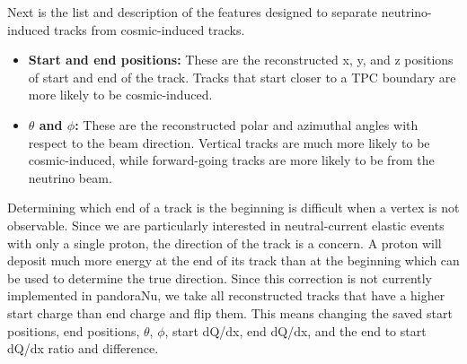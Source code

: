     Next is the list and description of the features designed to separate
    neutrino-induced tracks from cosmic-induced tracks.
    \begin{itemize}
      \item \textbf{Start and end positions:} These are the reconstructed x, y,
      and z positions of start and end of the track. Tracks that start closer
      to a TPC boundary are more likely to be cosmic-induced.
      \item \textbf{$\theta$ and $\phi$:} These are the reconstructed polar and
      azimuthal angles with respect to the beam direction. Vertical tracks are
      much more likely to be cosmic-induced, while forward-going tracks are
      more likely to be from the neutrino beam.
    \end{itemize}
   
    Determining which end of a track is the beginning is difficult when a
    vertex is not observable. Since we are particularly interested in
    neutral-current elastic events with only a single proton, the direction of
    the track is a concern. A proton will deposit much more energy at the end
    of its track than at the beginning which can be used to determine the true
    direction. Since this correction is not currently implemented in pandoraNu,
    we take all reconstructed tracks that have a higher start charge than end
    charge and flip them. This means changing the saved start positions, end
    positions, $\theta$, $\phi$, start dQ/dx, end dQ/dx, and the end to start
    dQ/dx ratio and difference.
    
